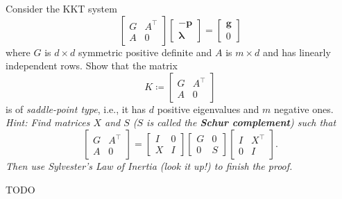 \documentclass{../kin_math}
\begin{document}
\begin{questions}
  \question Consider the KKT system
  \begin{equation*}
    \begin{bmatrix} G & A^\top \\ A & 0 \end{bmatrix} \begin{bmatrix} -\textbf{p} \\ \boldsymbol{\lambda} \end{bmatrix} = \begin{bmatrix} \textbf{g} \\ 0 \end{bmatrix}
  \end{equation*}
  where $G$ is $d \times d$ symmetric positive definite and $A$ is $m \times d$ and has linearly independent rows. Show that the matrix
  \begin{equation*}
    K \coloneqq \begin{bmatrix} G & A^\top \\ A & 0 \end{bmatrix}
  \end{equation*}
  is of \emph{saddle-point type}, i.e., it has $d$ positive eigenvalues and $m$ negative ones. \emph{Hint: Find matrices $X$ and $S$ ($S$ is called the \textbf{Schur complement}) such that
  \begin{equation*}
    \begin{bmatrix} G & A^\top \\ A & 0 \end{bmatrix} = \begin{bmatrix} I & 0 \\ X & I \end{bmatrix} \begin{bmatrix} G & 0 \\ 0 & S \end{bmatrix} \begin{bmatrix} I & X^\top \\ 0 & I \end{bmatrix}.
  \end{equation*}
  Then use Sylvester's Law of Inertia (look it up!) to finish the proof.}
  \begin{solution}
    TODO
  \end{solution}


\end{questions}
\end{document}
